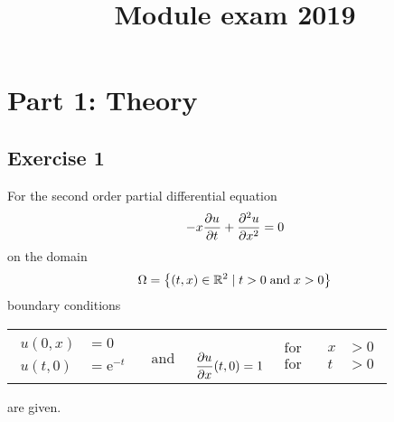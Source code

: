 \documentclass[
	final,
	a4paper,
	oneside,
	parskip=full,
	headings=standardclasses,
	headings=big,
	pointednumbers
]{scrartcl}
\title{Module exam 2019}
\author{}
\date{}
\newcommand{\f}[2]{\frac{#1}{#2}}
\newcommand{\kl}[1]{{\left( #1 \right)}}
\newcommand{\kq}[1]{{\left\{ #1 \right\}}}
\newcommand{\dom}{{\Omega}}
\newcommand{\e}{\mathrm{e}}
\begin{document}
    \maketitle

    \newpage

    \section*{Part 1: Theory}
	\subsection*{Exercise 1}

    For the second order partial differential equation
    \begin{align}
        -x\f{\pu}{\pt} + \f{\p[2] u}{\px[2]} = 0 \label{eq1}
    \end{align}
    on the domain
    \begin{align*}
        \dom = \kq{\kl{t, x} \in \re[2] \mid t > 0 \; \text{and} \; x > 0 }
    \end{align*}
    boundary conditions
    \begin{center}
        \vspace{-6mm}
        \begin{tabular}{ l l l l l }
            $\begin{aligned}
                u\kl{0,x} &= 0 \\
                u\kl{t,0} &= \e^{-t}
            \end{aligned}$ &
            $\begin{aligned}
                \\
                \text{and}
            \end{aligned}$ &
            $\begin{aligned}
                \\
                \f{\pu}{\px}\kl{t,0} = 1
            \end{aligned}$ &
            $\begin{aligned}
                \text{for} \\
                \text{for}
            \end{aligned}$ &
            $\begin{aligned}
                x &> 0 \\
                t &> 0
            \end{aligned}$
        \end{tabular}
        \vspace{-6mm}
    \end{center}
    are given.
\end{document}
